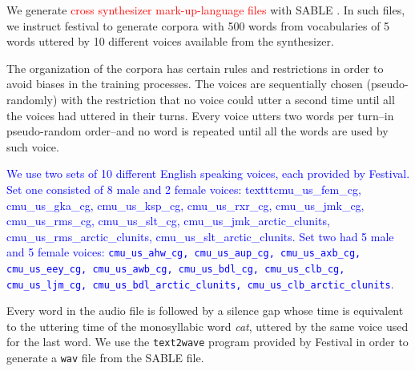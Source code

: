 \documentclass[10pt,letterpaper]{article}
\begin{document}

We generate \textcolor{red}{cross synthesizer mark-up-language files} with SABLE \cite{sable}.
In such files, we instruct \gls{festival} to generate corpora with 500 words from vocabularies of
5 words uttered by 10 different voices available from the synthesizer.

The organization of the corpora has certain rules and restrictions in order to avoid biases in the training processes.
The voices are sequentially chosen (pseudo-randomly) with the restriction that no voice could utter a second time until all the voices had uttered in their turns. Every voice utters two words per turn--in pseudo-random order--and no word is repeated until all the words are used by such voice. 

\textcolor{blue}{We use two sets of 10 different English speaking voices, each provided by Festival. Set one consisted of 8 male and 2 female voices: texttt{cmu\_us\_fem\_cg, cmu\_us\_gka\_cg, cmu\_us\_ksp\_cg, cmu\_us\_rxr\_cg, cmu\_us\_jmk\_cg, cmu\_us\_rms\_cg, cmu\_us\_slt\_cg, cmu\_us\_jmk\_arctic\_clunits, cmu\_us\_rms\_arctic\_clunits, cmu\_us\_slt\_arctic\_clunits}. Set two had 5 male and 5 female voices: \texttt{cmu\_us\_ahw\_cg, cmu\_us\_aup\_cg, cmu\_us\_axb\_cg, cmu\_us\_eey\_cg, cmu\_us\_awb\_cg, cmu\_us\_bdl\_cg, cmu\_us\_clb\_cg, cmu\_us\_ljm\_cg, cmu\_us\_bdl\_arctic\_clunits, cmu\_us\_clb\_arctic\_clunits}}.

Every word in the audio file is followed by a silence gap whose time is equivalent to the uttering time of the monosyllabic word \textit{cat}, uttered by the same voice used for the last word. We use the \texttt{text2wave} program provided by Festival in order to generate a \texttt{wav} file from the SABLE file.







\end{document}
